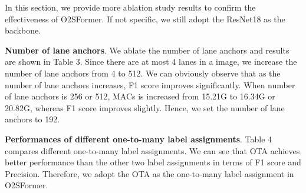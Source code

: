 \documentclass{bmvc2k}
\begin{document}
In this section, we provide more ablation study results to confirm the effectiveness of O2SFormer. 
If not specific, we still adopt the ResNet18 as the backbone.
\vspace{-0.3cm}
\begin{table}[!h]
   \centering
   \caption{Results of number of lane anchors.}
   \tabcolsep=0.5cm
   \small
 \end{table}

 {\bf Number of lane anchors}. We ablate the number of lane anchors and results are shown in Table 3. Since there are at most 4 lanes in a image, 
 we increase the number of lane anchors from 4 to 512. We can obviously observe that as the number of lane anchors increases, 
 F1 score improves significantly. When number of lane anchors is 256 or 512, MACs is increased from 15.21G to 
 16.34G or 20.82G, whereas F1 score improves slightly. Hence, we set the number of lane anchors to 192.

 \begin{table}[!h]
   \centering
   \caption{Performances of different one-to-many label assignments.}
   \tabcolsep=0.5cm
   \small
 \end{table}
 {\bf Performances of different one-to-many label assignments}. Table 4 compares different one-to-many label assignments. We can see that OTA achieves better performance 
 than the other two label assignments in terms of F1 score and Precision. 
 Therefore, we adopt the OTA as the one-to-many label assignment in O2SFormer.
\end{document}
